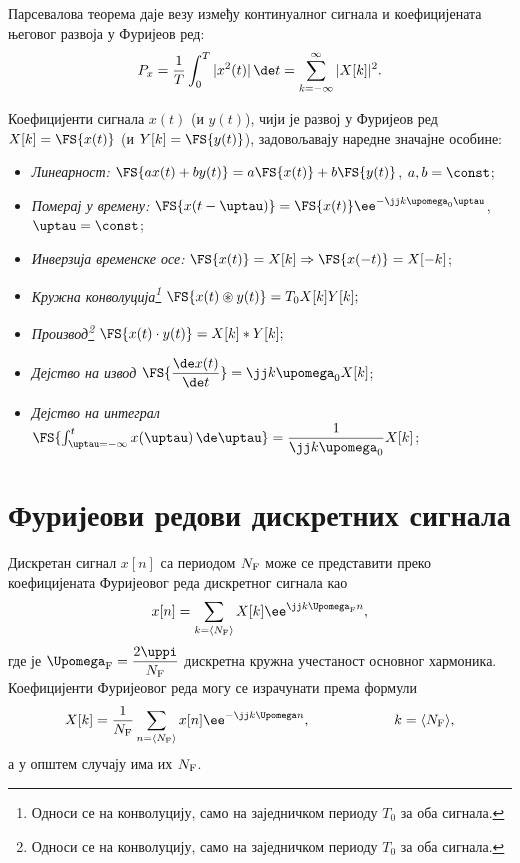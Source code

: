 \noindent 
Парсевалова теорема даје везу између  континуалног сигнала и коефицијената
његовог развоја у Фуријеов ред:
\begin{equation}
P_x = \dfrac{1}{T} \int_{0}^{T} |x^2(t)|\,\de t = \sum_{k=-\infty}^{\infty} |X[k]|^2. \label{eq:ctfs_parseval}
\end{equation}

Коефицијенти сигнала $x(t)$ (и $y(t)$), чији је развој у Фуријеов ред
$X[k] = \FS{x(t)}$ (и $Y[k] = \FS{y(t)}$),
задовољавају наредне значајне особине: 
\begin{itemize}\itemsep0pt
    \item \emph{Линеарност:}  $\FS{ax(t) + by(t)} = a \FS{x(t)} + b \FS{y(t)}$, $a,b = \const$; \hfill \Svojstvo
    \item \emph{Померај у времену:} $ \FS{x(t-\uptau)} = \FS{x(t)} \ee^{-\jj k \upomega_{\rm 0} \uptau}$, $\uptau = \const$; \hfill \Svojstvo
    \item \emph{Инверзија временске осе:} $\FS{x(t)} = X[k] \Rightarrow \FS{x(-t)} = X[-k] $; \hfill \Svojstvo
    \item \emph{Кружна конволуција\footnote{Односи се на конволуцију, само на заједничком периоду $T_0$ за оба сигнала.}} 
    $
    \FS{x(t) \circledast y(t)} = T_0 X[k] Y[k];
    $ \hfill \Svojstvo
    \item \emph{Производ\footnote{Односи се на конволуцију, само на заједничком периоду $T_0$ за оба сигнала.}}
    $
    \FS{x(t) \cdot y(t)} = X[k] \ast Y[k];
    $ \hfill \Svojstvo
    \item \emph{Дејство на извод} $\FS{ \dfrac{\de x(t)}{\de t} } = \jj k \upomega_0 X[k]$; \hfill \Svojstvo
    \item \emph{Дејство на интеграл} $\FS{ \int_{\uptau = -\infty}^t x(\uptau) \, \de \uptau } = \dfrac{1}{\jj k \upomega_0} X[k]$; \hfill \Svojstvo
\end{itemize}

\section*{Фуријеови редови дискретних сигнала}

Дискретан сигнал $x[n]$ са периодом $N_{\rm F}$ може се представити преко коефицијената Фуријеовог 
реда дискретног сигнала као
\begin{eqnarray}
    x[n] = \sum_{k = \langle N_{\rm F} \rangle } X[k] \ee^{ \jj k \Upomega_{\rm F} n }, 
\end{eqnarray}
где је $\Upomega_{\rm F} = \dfrac{2\uppi}{N_{\rm F}}$ дискретна кружна учестаност основног хармоника. Коефицијенти 
Фуријеовог реда могу се израчунати према формули 
\begin{equation}
    X[k] = \dfrac{1}{N_{\rm F}} \sum_{n = \langle N_{\rm F} \rangle} x[n] \ee^{-\jj k \Upomega n}, 
    \qquad\qquad\qquad
    k = \langle N_{\rm F} \rangle,
\end{equation}
а у општем случају има их $N_{\rm F}$. 

